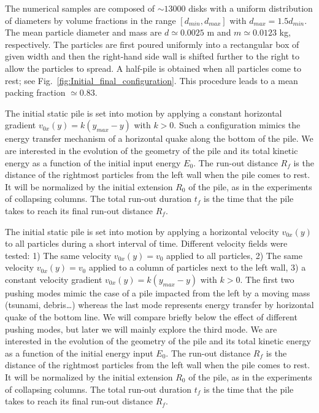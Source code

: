 The numerical samples are composed of $\sim13000$ disks with a uniform 
distribution of diameters by volume fractions in the range $[d_{min}, 
d_{max}]$ with $d_{max} = 1.5 d_{min}$. The mean particle diameter and 
mass are $d\simeq 0.0025 $ m and $m\simeq 0.0123$ kg, respectively. 
The particles are first poured uniformly into a rectangular box of given width 
and then the right-hand side wall is shifted further to the right to allow the 
particles to spread. A half-pile is obtained when all particles come to 
rest; see Fig.~\ref{fig:Initial_final_configuration}. This procedure leads to a 
mean packing fraction $\simeq 0.83$.


The initial static pile is set into motion by applying a constant horizontal
gradient  $v_{0x}(y) = k (y_{max} - y)$ with $k>0$. Such a configuration 
mimics the energy transfer mechanism of a horizontal quake along the bottom of 
the pile. We are interested in the evolution of the geometry of the pile 
and its total kinetic energy as a function of the initial input energy $E_0$. 
The run-out distance $R_f$ is the distance of the rightmost particles 
from the left wall when the pile comes to rest.  It will be normalized by the 
initial extension $R_0$ of the pile, as in the experiments of collapsing 
columns. The total run-out duration $t_f$ is the time that the pile takes to 
reach its final run-out distance $R_f$.

The initial static pile is set into motion by applying a horizontal velocity 
$v_{0x}(y)$ to all particles during a short interval of time. Different 
velocity fields were tested: 1) The same velocity $v_{0x}(y) = v_0$ applied to 
all particles, 2) The same velocity $v_{0x}(y) = v_0$ applied to a column of 
particles next to the left wall, 3) a constant velocity gradient  $v_{0x}(y) = 
k (y_{max} - y)$ with $k>0$. The first two pushing modes mimic the case of a 
pile impacted from the left by a moving mass (tsunami, debris\dots) whereas the 
last mode represents energy transfer by horizontal quake of the bottom line. We 
will compare briefly below the effect of different pushing modes, but later we 
will mainly explore the third mode. We are interested in the evolution of the 
geometry of the pile and its total kinetic energy as a function of the initial 
energy input $E_0$. The run-out distance $R_f$ is the distance of the rightmost 
particles from the left wall when the pile comes to rest.  
It will be normalized by the initial extension $R_0$ of the pile, as in 
the experiments of collapsing columns. The total run-out duration $t_f$ is the 
time that the pile takes to reach its final run-out distance $R_f$.       

